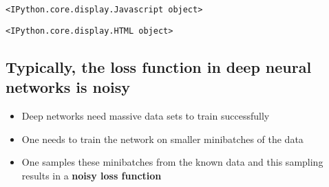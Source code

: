 \documentclass[11pt]{article}
\providecommand{\tightlist}{%
      \setlength{\itemsep}{0pt}\setlength{\parskip}{0pt}}
\begin{document}
    
    \begin{verbatim}
<IPython.core.display.Javascript object>
    \end{verbatim}

    
    
    \begin{verbatim}
<IPython.core.display.HTML object>
    \end{verbatim}

    
    \hypertarget{typically-the-loss-function-in-deep-neural-networks-is-noisy}{%
\subsection{Typically, the loss function in deep neural networks is
noisy}\label{typically-the-loss-function-in-deep-neural-networks-is-noisy}}

\begin{itemize}
\tightlist
\item
  Deep networks need massive data sets to train successfully
\item
  One needs to train the network on smaller minibatches of the data
\item
  One samples these minibatches from the known data and this sampling
  results in a \textbf{noisy loss function}
\end{itemize}
\end{document}
